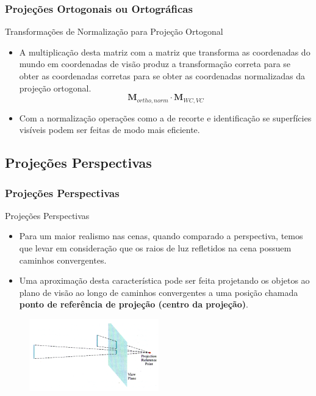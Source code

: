 \documentclass{beamer}
\begin{document}
\begin{frame}
\frametitle{Projeções Ortogonais ou Ortográficas}
	\begin{block}{Transformações de Normalização para Projeção Ortogonal}
		\begin{itemize}
			\item A multiplicação desta matriz com a matriz que transforma as coordenadas do mundo em coordenadas de visão produz a transformação correta para se obter as coordenadas corretas para se obter as coordenadas normalizadas da projeção ortogonal.
			\begin{equation*}
				\textbf{M}_{ortho,norm} \cdot \textbf{M}_{WC,VC}
			\end{equation*}
			
			\item Com a normalização operações como a de recorte e identificação se superfícies visíveis podem ser feitas de modo mais eficiente.
		\end{itemize}
	\end{block}
\end{frame}

\subsection{Projeções Perspectivas}
\begin{frame}
\frametitle{Projeções Perspectivas}
	\begin{block}{Projeções Perspectivas}
		\begin{itemize}
			\item Para um maior realismo nas cenas, quando comparado a perspectiva, temos que levar em consideração que os raios de luz refletidos na cena possuem caminhos convergentes.
			\item Uma aproximação desta característica pode ser feita projetando os objetos ao plano de visão ao longo de caminhos convergentes a uma posição chamada \textbf{ponto de referência de projeção (centro da projeção)}.
		\end{itemize}
	\end{block}
	
	\begin{figure}[!h]
			\begin{center}
			\includegraphics[width=0.5\textwidth]{Figures/PonPro}
			\end{center}
	\end{figure}
\end{frame}
\end{document}
